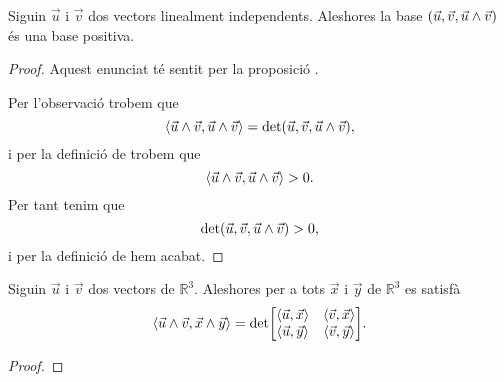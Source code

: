 \documentclass[../../Main.tex]{subfiles}
\begin{document}
	\begin{proposition}
		\label{prop:dos vectors linealment independents i el seu producte vectorial formen una base positiva}
		Siguin \(\vec{u}\) i \(\vec{v}\) dos vectors linealment independents. Aleshores la base \((\vec{u},\vec{v},\vec{u}\mathbin{\wedge}\vec{v})\) és una base positiva.
		\begin{proof}
			Aquest enunciat té sentit per la proposició .
			
			Per l'observació  trobem que
			\[
			    \prodesc{\vec{u}\prodvec\vec{v}}{\vec{u}\prodvec\vec{v}}=\det(\vec{u},\vec{v},\vec{u}\prodvec\vec{v}),
			\]
			i per la definició de  trobem que
			\[
			    \prodesc{\vec{u}\prodvec\vec{v}}{\vec{u}\prodvec\vec{v}}>0.
			\]
			Per tant tenim que
			\[
			    \det(\vec{u},\vec{v},\vec{u}\mathbin{\wedge}\vec{v})>0,
			\]
			i per la definició de  hem acabat.
		\end{proof}
	\end{proposition}
	\begin{proposition}
		\label{prop:fórmula de Lagrange}
		Siguin \(\vec{u}\) i \(\vec{v}\) dos vectors de \(\mathbb{R}^{3}\). Aleshores per a tots \(\vec{x}\) i \(\vec{y}\) de \(\mathbb{R}^{3}\) es satisfà
		\[\prodesc{\vec{u}\prodvec\vec{v}}{\vec{x}\prodvec\vec{y}}=\det\left[\begin{matrix}
			\prodesc{\vec{u}}{\vec{x}} & \prodesc{\vec{v}}{\vec{x}} \\
			\prodesc{\vec{u}}{\vec{y}} & \prodesc{\vec{v}}{\vec{y}}
		\end{matrix}\right].\]
		\begin{proof}
		\end{proof}
	\end{proposition}
\end{document}

